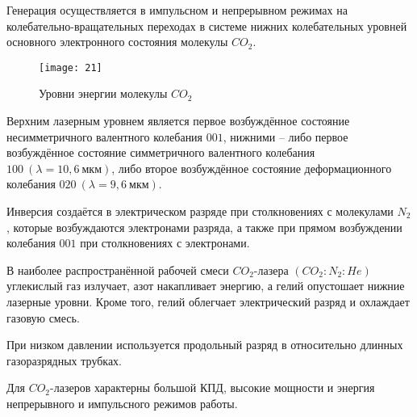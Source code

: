 Генерация осуществляется в импульсном и непрерывном режимах на 
колебательно-вращательных переходах в системе нижних колебательных уровней 
основного электронного состояния молекулы \( CO_2 \).
\begin{figure}[h]
    \center
    \texttt{[image: 21]}
    \caption{Уровни энергии молекулы \( CO_2 \)}
\end{figure}
Верхним лазерным уровнем является первое возбуждённое состояние несимметричного 
валентного колебания \( 001 \), нижними -- либо первое возбуждённое состояние 
симметричного валентного колебания \( 100\ (\lambda=10,6~\text{мкм}) \), либо 
второе возбуждённое состояние деформационного колебания 
\( 020\ (\lambda=9,6~\text{мкм}) \).

Инверсия создаётся в электрическом разряде при столкновениях с молекулами 
\( N_2 \), которые возбуждаются электронами разряда, а также при прямом 
возбуждении колебания \( 001 \) при столкновениях с электронами.

В наиболее распространённой рабочей смеси \( CO_2 \)-лазера \((CO_2:N_2:He)\) 
углекислый газ излучает, азот накапливает энергию, а гелий опустошает нижние 
лазерные уровни. Кроме того, гелий облегчает электрический разряд и охлаждает 
газовую смесь.

При низком давлении используется продольный разряд в относительно длинных 
газоразрядных трубках.

Для \( CO_2 \)-лазеров характерны большой КПД, высокие мощности и энергия 
непрерывного и импульсного режимов работы.